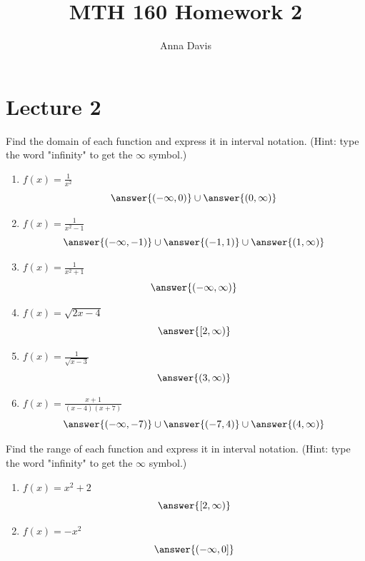 \documentclass{ximera}
\author{Anna Davis} \title{MTH 160 Homework 2}
\begin{document}
\begin{abstract}

\end{abstract}
\maketitle
 \section{Lecture 2}
\begin{problem}\label{prob:160hom2prob1}
Find the domain of each function and express it in interval notation.  (Hint: type the word "infinity" to get the $\infty$ symbol.)
\begin{enumerate}
    \item $f(x)=\frac{1}{x^2}$
    $$\answer{(-\infty,0)}\cup\answer{(0,\infty)}$$
    \item $f(x)=\frac{1}{x^2-1}$
    $$\answer{(-\infty,-1)}\cup\answer{(-1,1)}\cup\answer{(1,\infty)}$$
    \item $f(x)=\frac{1}{x^2+1}$
    $$\answer{(-\infty,\infty)}$$
    \item $f(x)=\sqrt{2x-4}$
    $$\answer{[2,\infty)}$$
     \item $f(x)=\frac{1}{\sqrt{x-3}}$
    $$\answer{(3,\infty)}$$
    \item $f(x)=\frac{x+1}{(x-4)(x+7)}$
    $$\answer{(-\infty,-7)}\cup\answer{(-7,4)}\cup\answer{(4,\infty)}$$
\end{enumerate}
\end{problem}

\begin{problem}\label{prob:160hom2prob2}
  Find the range of each function and express it in interval notation.  (Hint: type the word "infinity" to get the $\infty$ symbol.)
  \begin{enumerate}
      \item $f(x)=x^2+2$
      $$\answer{[2,\infty)}$$
      \item $f(x)=-x^2$
      $$\answer{(-\infty,0]}$$
  \end{enumerate}
\end{problem}
\end{document}
